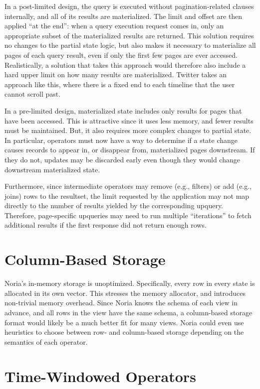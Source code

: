 In a post-limited design, the query is executed without pagination-related
clauses internally, and all of its results are materialized. The limit and
offset are then applied ``at the end'': when a query execution request comes in,
only an appropriate subset of the materialized results are returned. This
solution requires no changes to the partial state logic, but also makes it
necessary to materialize all pages of each query result, even if only the first
few pages are ever accessed. Realistically, a solution that takes this approach
would therefore also include a hard upper limit on how many results are
materialized. Twitter takes an approach like this, where there is a fixed end to
each timeline that the user cannot scroll past.

In a pre-limited design, materialized state includes only results for pages that
have been accessed. This is attractive since it uses less memory, and fewer
results must be maintained. But, it also requires more complex changes to
partial state. In particular, operators must now have a way to determine if a
state change causes records to appear in, or disappear from, materialized pages
downstream. If they do not, updates may be discarded early even though they
would change downstream materialized state.

Furthermore, since intermediate operators may remove (e.g., filters) or add
(e.g., joins) rows to the resultset, the limit requested by the application may
not map directly to the number of results yielded by the corresponding upquery.
Therefore, page-specific upqueries may need to run multiple ``iterations'' to
fetch additional results if the first response did not return enough rows.

\section{Column-Based Storage}

Noria's in-memory storage is unoptimized. Specifically, every row in every state
is allocated in its own vector. This stresses the memory allocator, and
introduces non-trivial memory overhead. Since Noria knows the schema of each
view in advance, and all rows in the view have the same schema, a column-based
storage format would likely be a much better fit for many views. Noria could
even use heuristics to choose between row- and column-based storage depending on
the semantics of each operator.

\section{Time-Windowed Operators}

